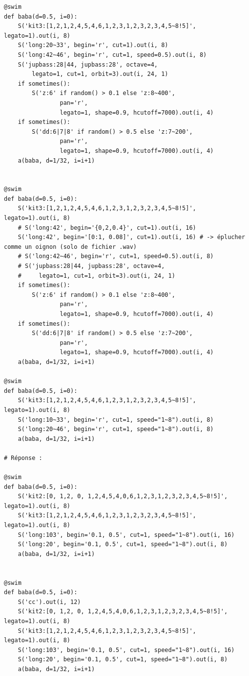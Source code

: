 \documentclass[11pt]{article}
\begin{document}
\begin{enumerate}
\begin{verbatim}
@swim
def baba(d=0.5, i=0):
    S('kit3:[1,2,1,2,4,5,4,6,1,2,3,1,2,3,2,3,4,5~8!5]', legato=1).out(i, 8)
    S('long:20~33', begin='r', cut=1).out(i, 8)
    S('long:42~46', begin='r', cut=1, speed=0.5).out(i, 8)
    S('jupbass:28|44, jupbass:28', octave=4,
        legato=1, cut=1, orbit=3).out(i, 24, 1)
    if sometimes():
        S('z:6' if random() > 0.1 else 'z:8~400',
                pan='r',
                legato=1, shape=0.9, hcutoff=7000).out(i, 4)
    if sometimes():
        S('dd:6|7|8' if random() > 0.5 else 'z:7~200',
                pan='r',
                legato=1, shape=0.9, hcutoff=7000).out(i, 4)
    a(baba, d=1/32, i=i+1)


@swim
def baba(d=0.5, i=0):
    S('kit3:[1,2,1,2,4,5,4,6,1,2,3,1,2,3,2,3,4,5~8!5]', legato=1).out(i, 8)
    # S('long:42', begin='{0,2,0.4}', cut=1).out(i, 16)
    S('long:42', begin='[0:1, 0.08]', cut=1).out(i, 16) # -> éplucher comme un oignon (solo de fichier .wav)
    # S('long:42~46', begin='r', cut=1, speed=0.5).out(i, 8)
    # S('jupbass:28|44, jupbass:28', octave=4,
    #     legato=1, cut=1, orbit=3).out(i, 24, 1)
    if sometimes():
        S('z:6' if random() > 0.1 else 'z:8~400',
                pan='r',
                legato=1, shape=0.9, hcutoff=7000).out(i, 4)
    if sometimes():
        S('dd:6|7|8' if random() > 0.5 else 'z:7~200',
                pan='r',
                legato=1, shape=0.9, hcutoff=7000).out(i, 4)
    a(baba, d=1/32, i=i+1)

@swim
def baba(d=0.5, i=0):
    S('kit3:[1,2,1,2,4,5,4,6,1,2,3,1,2,3,2,3,4,5~8!5]', legato=1).out(i, 8)
    S('long:10~33', begin='r', cut=1, speed="1~8").out(i, 8)
    S('long:20~46', begin='r', cut=1, speed="1~8").out(i, 8)
    a(baba, d=1/32, i=i+1)

# Réponse :

@swim
def baba(d=0.5, i=0):
    S('kit2:[0, 1,2, 0, 1,2,4,5,4,0,6,1,2,3,1,2,3,2,3,4,5~8!5]', legato=1).out(i, 8)
    S('kit3:[1,2,1,2,4,5,4,6,1,2,3,1,2,3,2,3,4,5~8!5]', legato=1).out(i, 8)
    S('long:103', begin='0.1, 0.5', cut=1, speed="1~8").out(i, 16)
    S('long:20', begin='0.1, 0.5', cut=1, speed="1~8").out(i, 8)
    a(baba, d=1/32, i=i+1)


@swim
def baba(d=0.5, i=0):
    S('cc').out(i, 12)
    S('kit2:[0, 1,2, 0, 1,2,4,5,4,0,6,1,2,3,1,2,3,2,3,4,5~8!5]', legato=1).out(i, 8)
    S('kit3:[1,2,1,2,4,5,4,6,1,2,3,1,2,3,2,3,4,5~8!5]', legato=1).out(i, 8)
    S('long:103', begin='0.1, 0.5', cut=1, speed="1~8").out(i, 16)
    S('long:20', begin='0.1, 0.5', cut=1, speed="1~8").out(i, 8)
    a(baba, d=1/32, i=i+1)


\end{verbatim}
\end{enumerate}
\end{document}
